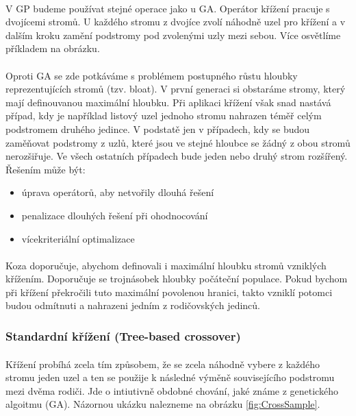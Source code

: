 \documentclass[bc,male,java,dept460]{diploma}		%
\begin{document}
\paragraph*{}
V GP budeme používat stejné operace jako u GA. Operátor křížení pracuje s dvojícemi stromů. U každého stromu z dvojíce zvolí náhodně uzel pro křížení a v dalším kroku zamění podstromy pod zvolenými uzly mezi sebou. Více osvětlíme příkladem na obrázku.


\paragraph*{}
Oproti GA se zde potkáváme s problémem postupného růstu hloubky reprezentujících stromů (tzv. bloat). V první generaci si obstaráme stromy, který mají definouvanou maximální hloubku. Při aplikaci křížení však snad nastává případ, kdy je například listový uzel jednoho stromu nahrazen téměř celým podstromem druhého jedince. V podstatě jen v případech, kdy se budou zaměňovat podstromy z uzlů, které jsou ve stejné hloubce se žádný z obou stromů nerozšiřuje. Ve všech ostatních případech bude jeden nebo druhý strom rozšířený. Řešením může být:
\begin{itemize}
\item úprava operátorů, aby netvořily dlouhá řešení
\item penalizace dlouhých řešení při ohodnocování
\item vícekriteriální optimalizace
\end{itemize}

\paragraph*{}
Koza doporučuje, abychom definovali i maximální hloubku stromů vzniklých křížením. Doporučuje se trojnásobek hloubky počáteční populace. Pokud bychom při křížení překročili tuto maximální povolenou hranici, takto vzniklí potomci budou odmítnuti a nahrazeni jedním z rodičovských jedinců.

\subsubsection{Standardní křížení (Tree-based crossover)}
\paragraph*{}
Křížení probíhá zcela tím způsobem, že se zcela náhodně vybere z každého stromu jeden uzel a ten se použije k následné výměně souvisejícího podstromu mezi dvěma rodiči. Jde o intiutivně obdobné chování, jaké známe z genetického algoitmu (GA). Názornou ukázku nalezneme na obrázku \ref{fig:CrossSample}.
\end{document}
